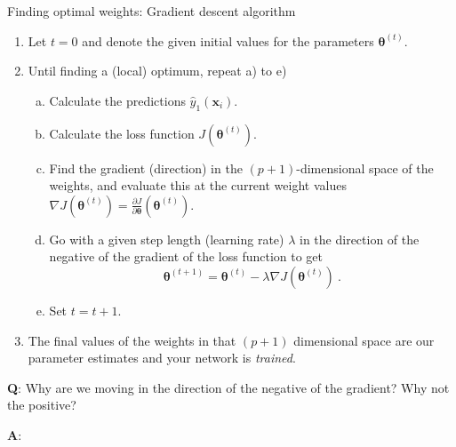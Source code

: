 \documentclass[
  10pt,
  ignorenonframetext,
]{beamer}
\providecommand{\tightlist}{%
  \setlength{\itemsep}{0pt}\setlength{\parskip}{0pt}}
\begin{document}
\begin{frame}
\begin{block}{Finding optimal weights: Gradient descent algorithm}
\protect\hypertarget{finding-optimal-weights-gradient-descent-algorithm}{}
\vspace{2mm}

\begin{enumerate}
\tightlist
\item
  Let \(t=0\) and denote the given initial values for the parameters
  \({\boldsymbol \theta}^{(t)}\). \vspace{2mm}
\item
  Until finding a (local) optimum, repeat a) to e)

  \begin{enumerate}
  [a)]
  \tightlist
  \item
    Calculate the predictions \({\hat{y}_1({\boldsymbol x}_i)}\).
  \item
    Calculate the loss function \(J({\boldsymbol \theta}^{(t)})\).
  \item
    Find the gradient (direction) in the \((p+1)\)-dimensional space of
    the weights, and evaluate this at the current weight values
    \(\nabla J({\boldsymbol \theta}^{(t)})={\frac{\partial J}{\partial {\boldsymbol \theta}}}({\boldsymbol \theta}^{(t)})\).
  \item
    Go with a given step length (learning rate) \(\lambda\) in the
    direction of the negative of the gradient of the loss function to
    get
    \[{\boldsymbol \theta}^{(t+1)}={\boldsymbol \theta}^{(t)} - \lambda \nabla J({\boldsymbol \theta}^{(t)}) \ .\]
  \item
    Set \(t=t+1\). \vspace{2mm}
  \end{enumerate}
\item
  The final values of the weights in that \((p+1)\) dimensional space
  are our parameter estimates and your network is \emph{trained}.
\end{enumerate}
\end{block}
\end{frame}

\begin{frame}
\textbf{Q}: Why are we moving in the direction of the negative of the
gradient? Why not the positive?

\textbf{A}:
\end{frame}
\end{document}

